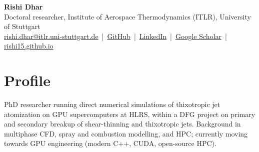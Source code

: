 \documentclass[10pt,a4paper]{article}
\begin{document}
{\Huge\bfseries Rishi Dhar}\\[3pt]
{\large Doctoral researcher, Institute of Aerospace Thermodynamics (ITLR), University of Stuttgart}\\[4pt]
\href{mailto:rishi.dhar@itlr.uni-stuttgart.de}{rishi.dhar@itlr.uni-stuttgart.de} \,|\,
\href{https://github.com/Rishi15}{GitHub} \,|\,
\href{https://www.linkedin.com/in/rishi-dhar-0811/}{LinkedIn} \,|\,
\href{https://scholar.google.com/citations?user=Dbk4V_cAAAAJ&hl=en}{Google Scholar} \,|\,
\href{https://rishi15.github.io}{rishi15.github.io}

\section{Profile}
PhD researcher running direct numerical simulations of thixotropic jet atomization on GPU
supercomputers at HLRS, within a DFG project on primary and secondary breakup of shear-thinning
and thixotropic jets. Background in multiphase CFD, spray and combustion modelling, and HPC;
currently moving towards GPU engineering (modern C++, CUDA, open-source HPC).
\end{document}
